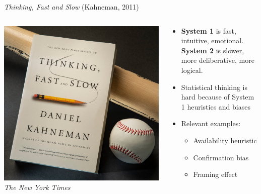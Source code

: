 \documentclass[handout]{beamer}
\begin{document}
  \begin{frame}{{\it Thinking, Fast and Slow} (Kahneman, 2011)}
    \begin{columns}
      \begin{column}{0.4\textwidth}
    \includegraphics[width = \textwidth]{images/thinking_fast_and_slow.jpg}\\
    \small {\color{gray} \it The New York Times}
      \end{column}
      \begin{column}{0.6\textwidth}
        \begin{itemize}
          \item {\bf System 1} is fast, intuitive, emotional. {\bf System 2} is slower, more deliberative, more logical.
          \item Statistical thinking is hard because of System 1 heuristics and biases
          \item Relevant examples:
          \begin{itemize}
            \item Availability heuristic
            \item Confirmation bias
            \item Framing effect
          \end{itemize}
        \end{itemize}
      \end{column}
    \end{columns}
  \end{frame}
\end{document}
